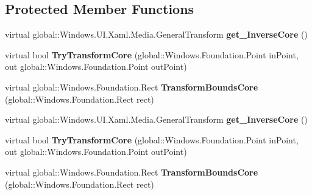 \subsection*{Protected Member Functions}
\begin{DoxyCompactItemize}
\item 
\mbox{\label{class_windows_1_1_u_i_1_1_xaml_1_1_media_1_1_general_transform_ae7e32f7d25e758f47ae50ffc2db532dc}} 
virtual global\+::\+Windows.\+U\+I.\+Xaml.\+Media.\+General\+Transform {\bfseries get\+\_\+\+Inverse\+Core} ()
\item 
\mbox{\label{class_windows_1_1_u_i_1_1_xaml_1_1_media_1_1_general_transform_aa7cc04e60b1e0ab4460a3aa82b822be3}} 
virtual bool {\bfseries Try\+Transform\+Core} (global\+::\+Windows.\+Foundation.\+Point in\+Point, out global\+::\+Windows.\+Foundation.\+Point out\+Point)
\item 
\mbox{\label{class_windows_1_1_u_i_1_1_xaml_1_1_media_1_1_general_transform_a87c2edc3cf75f7b47f399befb5496002}} 
virtual global\+::\+Windows.\+Foundation.\+Rect {\bfseries Transform\+Bounds\+Core} (global\+::\+Windows.\+Foundation.\+Rect rect)
\item 
\mbox{\label{class_windows_1_1_u_i_1_1_xaml_1_1_media_1_1_general_transform_ae7e32f7d25e758f47ae50ffc2db532dc}} 
virtual global\+::\+Windows.\+U\+I.\+Xaml.\+Media.\+General\+Transform {\bfseries get\+\_\+\+Inverse\+Core} ()
\item 
\mbox{\label{class_windows_1_1_u_i_1_1_xaml_1_1_media_1_1_general_transform_aa7cc04e60b1e0ab4460a3aa82b822be3}} 
virtual bool {\bfseries Try\+Transform\+Core} (global\+::\+Windows.\+Foundation.\+Point in\+Point, out global\+::\+Windows.\+Foundation.\+Point out\+Point)
\item 
\mbox{\label{class_windows_1_1_u_i_1_1_xaml_1_1_media_1_1_general_transform_a87c2edc3cf75f7b47f399befb5496002}} 
virtual global\+::\+Windows.\+Foundation.\+Rect {\bfseries Transform\+Bounds\+Core} (global\+::\+Windows.\+Foundation.\+Rect rect)

\end{DoxyCompactItemize}
